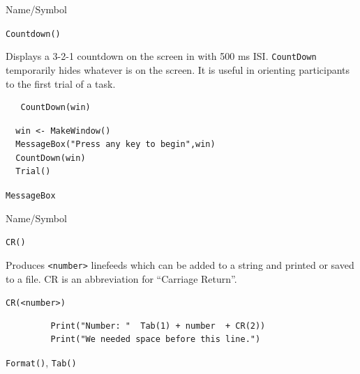 \begin{desc}{Name/Symbol}
\item[Name/Symbol]  	\verb+Countdown()+
			 
\item[Description] 	Displays a 3-2-1 countdown on the screen in with 500 ms ISI.
\verb+CountDown+ temporarily hides whatever is on the screen. It is useful in orienting participants to
the first trial of a task.

\item[Usage]		
\begin{verbatim}
   CountDown(win)
\end{verbatim}

\item[Example]	
\begin{verbatim}
  win <- MakeWindow()
  MessageBox("Press any key to begin",win)
  CountDown(win)
  Trial()
\end{verbatim}

\item[See Also]   \verb+MessageBox+
\end{desc}



\begin{desc}{Name/Symbol}

\item[Name/Symbol] \verb+CR()+

\item[Description]  Produces \verb+<number>+ linefeeds which can be added to a
  string and printed or saved to a file.  CR is an abbreviation for ``Carriage Return''.

\item[Usage]\verb!CR(<number>)!

\item[Example]     
\begin{verbatim}
         Print("Number: "  Tab(1) + number  + CR(2))
         Print("We needed space before this line.")
\end{verbatim}
\item[See Also]
\verb+Format()+, \verb+Tab()+
\end{desc}






